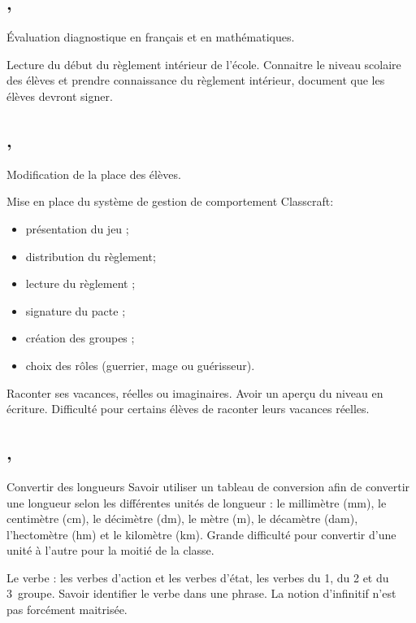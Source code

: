 \documentclass{article}
\begin{document}
\subsection{ \sep}
\textbullet{} Évaluation diagnostique en français et en mathématiques.

\emc Lecture du début du règlement intérieur de l’école.
\obj Connaitre le niveau scolaire des élèves et prendre connaissance du règlement intérieur, document que les élèves devront signer.


\subsection{ \sep}
\textbullet{} Modification de la place des élèves.

\textbullet{} Mise en place du système de gestion de comportement Classcraft:
\begin{itemize}
	\item présentation du jeu ;
	\item distribution du règlement;
	\item lecture du règlement ;
	\item signature du pacte ;
	\item création des groupes ;
	\item choix des rôles (guerrier, mage ou guérisseur).
\end{itemize}\vspace{1ex}

\ecr Raconter ses vacances, réelles ou imaginaires.
\obj Avoir un aperçu du niveau en écriture.
\bil Difficulté pour certains élèves de raconter leurs vacances réelles.


\subsection{ \sep}
\gem\ham Convertir des longueurs
\obj Savoir utiliser un tableau de conversion afin de convertir une longueur selon les différentes unités de longueur : le millimètre (mm), le centimètre (cm), le décimètre (dm), le mètre (m), le décamètre (dam), l’hectomètre (hm) et le kilomètre (km).
\bil Grande difficulté pour convertir d’une unité à l’autre pour la moitié de la classe.

\gra\hpm Le verbe : les verbes d’action et les verbes d’état, les verbes du 1\ier{}, du 2\ieme{} et du 3\ieme{}~groupe.
\obj Savoir identifier le verbe dans une phrase.
\bil La notion d’infinitif n’est pas forcément maitrisée.
\end{document}
